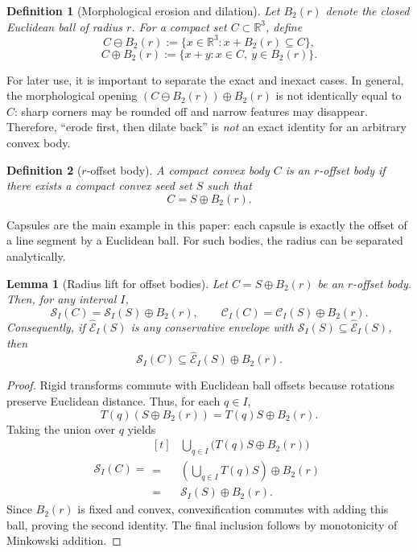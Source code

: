 \documentclass[journal]{IEEEtran}
\newtheorem{definition}{Definition}
\newtheorem{lemma}{Lemma}
\newcommand{\Real}{\ensuremath{\mathbb{R}}}
\begin{document}
\begin{definition}[Morphological erosion and dilation]
Let $B_2(r)$ denote the closed Euclidean ball of radius $r$. For a compact set
$C \subset \Real^3$, define
\[
C \ominus B_2(r) := \{x \in \Real^3 : x + B_2(r) \subseteq C\},
\]
\[
C \oplus B_2(r) := \{x+y : x\in C,\ y\in B_2(r)\}.
\]
\end{definition}

For later use, it is important to separate the exact and inexact cases. In
general, the morphological opening $(C \ominus B_2(r)) \oplus B_2(r)$ is not
identically equal to $C$: sharp corners may be rounded off and narrow features
may disappear. Therefore, ``erode first, then dilate back'' is \emph{not} an
exact identity for an arbitrary convex body.

\begin{definition}[$r$-offset body]
A compact convex body $C$ is an $r$-offset body if there exists a compact convex
seed set $S$ such that
\[
C = S \oplus B_2(r).
\]
\end{definition}

Capsules are the main example in this paper: each capsule is exactly the offset
of a line segment by a Euclidean ball. For such bodies, the radius can be
separated analytically.

\begin{lemma}[Radius lift for offset bodies]\label{lem:offset_lift}
Let $C = S \oplus B_2(r)$ be an $r$-offset body. Then, for any interval $I$,
\[
\mathcal{S}_I(C) = \mathcal{S}_I(S) \oplus B_2(r),
\qquad
\mathcal{C}_I(C) = \mathcal{C}_I(S) \oplus B_2(r).
\]
Consequently, if $\widehat{\mathcal{E}}_I(S)$ is any conservative envelope with
$\mathcal{S}_I(S) \subseteq \widehat{\mathcal{E}}_I(S)$, then
\[
\mathcal{S}_I(C) \subseteq \widehat{\mathcal{E}}_I(S) \oplus B_2(r).
\]
\end{lemma}

\begin{proof}
Rigid transforms commute with Euclidean ball offsets because rotations preserve
Euclidean distance. Thus, for each $q \in I$,
\[
T(q)(S \oplus B_2(r)) = T(q)S \oplus B_2(r).
\]
Taking the union over $q$ yields
\[
\mathcal{S}_I(C)
= \begin{aligned}[t]
&\bigcup_{q\in I} \bigl(T(q)S \oplus B_2(r)\bigr) \\
=\;&\left(\bigcup_{q\in I} T(q)S\right) \oplus B_2(r) \\
=\;&\mathcal{S}_I(S) \oplus B_2(r).
\end{aligned}
\]
Since $B_2(r)$ is fixed and convex, convexification commutes with adding this
ball, proving the second identity. The final inclusion follows by monotonicity
of Minkowski addition.
\end{proof}
\end{document}
